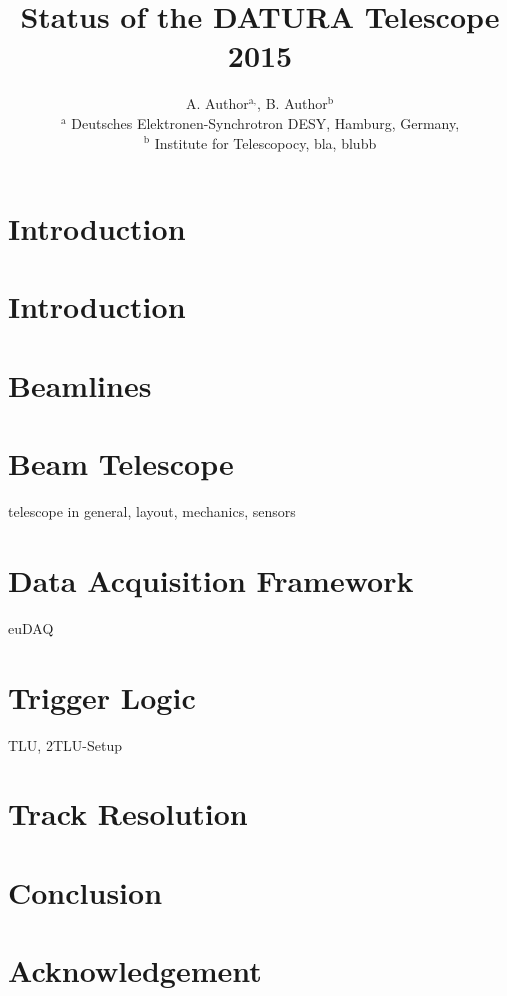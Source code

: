 \documentclass{JINST}
\title{Status of the DATURA Telescope 2015}
\author{A. Author${}^{\textrm{a},}$, B. Author${}^{\textrm{b}}$\\
${}^{\textrm{a}}$ Deutsches Elektronen-Synchrotron DESY, Hamburg, Germany,\\
${}^{\textrm{b}}$ Institute for Telescopocy, bla, blubb
}
\begin{document}
 \setpagewiselinenumbers
\modulolinenumbers[5]
\linenumbers

\normalsize

\section{Introduction}


\section{Introduction}

\section{Beamlines}

\section{Beam Telescope}
telescope in general, layout, mechanics, sensors

\section{Data Acquisition Framework}
euDAQ

\section{Trigger Logic}
TLU, 2TLU-Setup



\section{Track Resolution}

\section{Conclusion}

\section*{Acknowledgement}

\small


\end{document}
